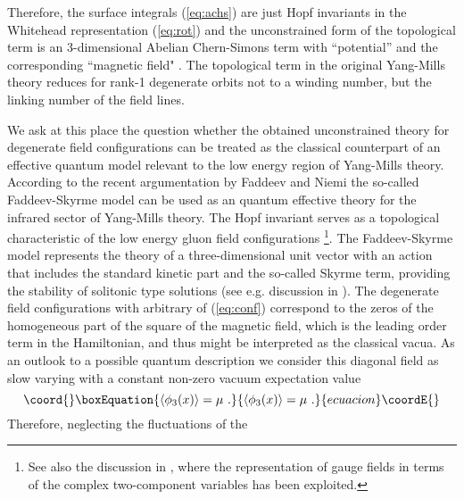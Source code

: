\documentclass[a4paper,12pt]{article}
\begin{document}
Therefore, the surface integrals (\ref{eq:achs}) are just Hopf invariants
in the Whitehead representation (\ref{eq:rot})
and the unconstrained form of the topological term \coordHE{}
is an 3-dimensional Abelian Chern-Simons term \cite{Jackiw}
with ``potential'' \coordHE{} and the corresponding ``magnetic
field" \coordHE{}.
The topological term in the original \coordHE{} Yang-Mills theory
reduces for rank-1 degenerate orbits not to a winding number,
but the linking number \coordHE{} of the field lines.

We ask at this place the question whether the obtained unconstrained theory for
degenerate field configurations can be treated as the classical counterpart of
an effective quantum model relevant to the low energy region of Yang-Mills theory.
According to the recent argumentation by
Faddeev and Niemi \cite{FaddeevNiemi} the so-called
\coordHE{} Faddeev-Skyrme model can be used as an quantum effective
theory for the infrared sector of Yang-Mills theory. The Hopf invariant
serves as a topological characteristic of the low energy gluon
field configurations \cite{Langmann}
\footnote{See also the discussion in
\cite{BaalWipf},  where the representation of gauge fields in terms of the
complex two-component \coordHE{} variables has been exploited.}.
The \coordHE{} Faddeev-Skyrme model represents the
theory of a three-dimensional unit vector with an action
that includes the standard kinetic part and the so-called
Skyrme term, providing the stability of solitonic type solutions
(see e.g. discussion in \cite{Battye:1998}).
The degenerate field configurations \coordHE{}
with arbitrary \coordHE{} of (\ref{eq:conf}) correspond to the zeros of the
homogeneous part of the square of the magnetic field, which is the leading
order \coordHE{} term in the Hamiltonian, and thus might
be interpreted as the classical vacua.
As an outlook to a possible quantum description we consider this diagonal field
\coordHE{} as slow varying with a constant non-zero vacuum expectation value
\begin{equation}\coord{}\boxEquation{\label{eq:nexp}
\langle \phi_3(x)\rangle = \mu~.
}{\langle \phi_3(x)\rangle = \mu~.
}{ecuacion}\coordE{}\end{equation}
Therefore, neglecting the fluctuations of the
\end{document}
